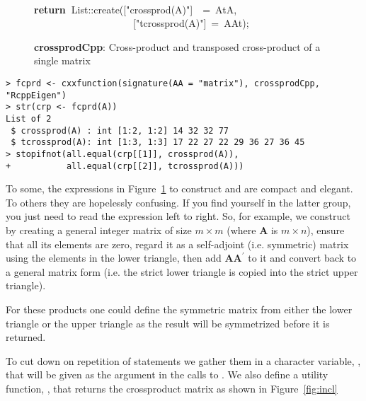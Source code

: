 \documentclass[shortnames,article]{jss}
\newcommand{\hlstd}[1]{\textcolor[rgb]{0,0,0}{#1}}
\newcommand{\hlopt}[1]{\textcolor[rgb]{0,0,0}{#1}}
\newcommand{\hlstr}[1]{\textcolor[rgb]{0.90,0.15,0.15}{#1}}
\newcommand{\hlkwa}[1]{\textcolor[rgb]{0.61,0.13,0.93}{\bf{#1}}}
\newcommand{\hlkwd}[1]{\textcolor[rgb]{0,0,0}{#1}}
\begin{document}
\begin{figure}[htb]
    \hlstd{}\hspace*{\fill}\\
    \hlkwa{return\ }\hlstd{List}\hlopt{::}\hlstd{}\hlkwd{create}\hlstd{}\hlopt{(}\hlstd{\textunderscore }\hlopt{{[}}\hlstd{}\hlstr{"crossprod(A)"}\hlstd{}\hlopt{{]}}\hlstd{\ \ }\hlopt{=\ }\hlstd{AtA}\hlopt{,}\hspace*{\fill}\\
    \hlstd{}\hlstd{\ \ \ \ \ \ \ \ \ \ \ \ \ \ \ \ \ \ \ \ }\hlstd{\textunderscore }\hlopt{{[}}\hlstd{}\hlstr{"tcrossprod(A)"}\hlstd{}\hlopt{{]}\ =\ }\hlstd{AAt}\hlopt{);}\hlstd{}\hspace*{\fill}
    \normalfont
    \normalsize
  \caption{\textbf{crossprodCpp}: Cross-product and transposed cross-product of a single matrix}
  \label{crossprod}
\end{figure}
\begin{verbatim}
> fcprd <- cxxfunction(signature(AA = "matrix"), crossprodCpp, "RcppEigen")
> str(crp <- fcprd(A))
List of 2
 $ crossprod(A) : int [1:2, 1:2] 14 32 32 77
 $ tcrossprod(A): int [1:3, 1:3] 17 22 27 22 29 36 27 36 45
> stopifnot(all.equal(crp[[1]], crossprod(A)),
+           all.equal(crp[[2]], tcrossprod(A)))
\end{verbatim}

To some, the expressions in Figure~\ref{crossprod} to construct
 and  are compact and elegant.  To others they are
hopelessly confusing.  If you find yourself in the latter group, you
just need to read the expression left to right.  So, for example, we
construct  by creating a general integer matrix of size
$m\times m$ (where $\bm A$ is $m\times n$), ensure that all its
elements are zero, regard it as a self-adjoint (i.e. symmetric) matrix
using the elements in the lower triangle, then add $\bm A\bm A^\prime$
to it and convert back to a general matrix form (i.e. the strict lower
triangle is copied into the strict upper triangle).

For these products one could define the symmetric matrix from either
the lower triangle or the upper triangle as the result will be
symmetrized before it is returned.

To cut down on repetition of  statements we gather them in
a character variable, , that will be given as the  argument
in the calls to .  We also define a utility
function, , that returns the crossproduct matrix as shown in Figure~\ref{fig:incl}
\end{document}
